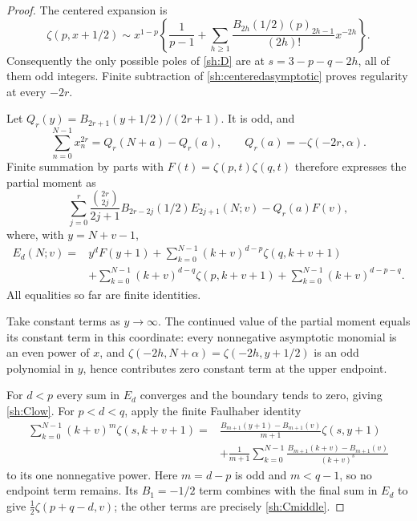 \documentclass[11pt]{article}
\theoremstyle{definition}
\theoremstyle{remark}
\numberwithin{equation}{section}
\begin{document}
\begin{proof}
The centered expansion is
\begin{equation}\label{sh:centeredasymptotic}
 \zeta(p,x+1/2)\sim x^{1-p}
 \left\{\frac1{p-1}+\sum_{h\ge1}
   \frac{B_{2h}(1/2)(p)_{2h-1}}{(2h)!}x^{-2h}\right\}.
\end{equation}
Consequently the only possible poles of \eqref{sh:D} are at
$s=3-p-q-2h$, all of them odd integers.  Finite subtraction of
\eqref{sh:centeredasymptotic} proves regularity at every $-2r$.

Let $Q_r(y)=B_{2r+1}(y+1/2)/(2r+1)$.  It is odd, and
\[
 \sum_{n=0}^{N-1}x_n^{2r}=Q_r(N+a)-Q_r(a),\qquad
 Q_r(a)=-\zeta(-2r,\alpha).
\]
Finite summation by parts with
$F(t)=\zeta(p,t)\zeta(q,t)$ therefore expresses the partial
moment as
\begin{equation}\label{sh:finiteEtransform}
 \sum_{j=0}^r
   \frac{\binom{2r}{2j}}{2j+1}B_{2r-2j}(1/2)
        E_{2j+1}(N;v)-Q_r(a)F(v),
\end{equation}
where, with $y=N+v-1$,
\begin{align*}
 E_d(N;v)={}&y^dF(y+1)
  +\sum_{k=0}^{N-1}(k+v)^{d-p}\zeta(q,k+v+1)\\
 &+\sum_{k=0}^{N-1}(k+v)^{d-q}\zeta(p,k+v+1)
  +\sum_{k=0}^{N-1}(k+v)^{d-p-q}.
\end{align*}
All equalities so far are finite identities.

Take constant terms as $y\to\infty$.  The continued value of the
partial moment equals its constant term in this coordinate: every
nonnegative asymptotic monomial is an even power of $x$, and
$\zeta(-2h,N+\alpha)=\zeta(-2h,y+1/2)$ is an odd polynomial in
$y$, hence contributes zero constant term at the upper endpoint.

For $d<p$ every sum in $E_d$ converges and the boundary tends to
zero, giving \eqref{sh:Clow}.  For $p<d<q$, apply the finite
Faulhaber identity
\begin{align*}
 \sum_{k=0}^{N-1}(k+v)^m\zeta(s,k+v+1)
 ={}&\frac{B_{m+1}(y+1)-B_{m+1}(v)}{m+1}\zeta(s,y+1)\\
 &+\frac1{m+1}\sum_{k=0}^{N-1}
      \frac{B_{m+1}(k+v)-B_{m+1}(v)}{(k+v)^s}
\end{align*}
to its one nonnegative power.  Here $m=d-p$ is odd and
$m<q-1$, so no endpoint term remains.  Its $B_1=-1/2$ term
combines with the final sum in $E_d$ to give
$\tfrac12\zeta(p+q-d,v)$; the other terms are precisely
\eqref{sh:Cmiddle}.


\end{proof}
\end{document}
